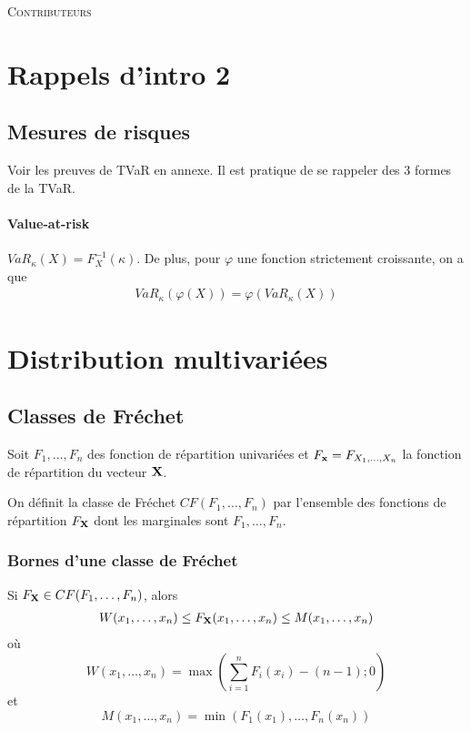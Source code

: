 \documentclass[10pt, french]{article}
\begin{document}
\begin{center}
	\textsc{\Large Contributeurs}\\[0.5cm] 
\end{center}


\newpage

\begin{multicols*}{2} 

\section{Rappels d'intro 2}
\subsection{Mesures de risques}
Voir les preuves de TVaR en annexe. Il est pratique de se rappeler des 3 formes de la TVaR.

\paragraph{Value-at-risk}
$VaR_{\kappa}(X) = F_{X}^{-1}(\kappa)$. De plus, pour $\varphi$ une fonction strictement croissante, on a que
\begin{align*}
VaR_{\kappa}(\varphi(X)) = \varphi \left ( VaR_{\kappa}(X) \right )
\end{align*}



\section{Distribution multivariées}
\subsection{Classes de Fréchet}
Soit $F_1, \dots, F_n$ des fonction de répartition univariées et $F_{\mathbf{x}} = F_{X_1, \dots, X_n}$ la fonction de répartition du vecteur $\mathbf{X}$.

On définit la classe de Fréchet $CF(F_1, \dots, F_n)$ par l'ensemble des fonctions de répartition $F_{\mathbf{X}}$ dont les marginales sont $F_1, \dots, F_n$.

\subsubsection{Bornes d'une classe de Fréchet}
Si $F_{\mathbf{X}} \in CF(F_1, \dots, F_n)$, alors
\begin{align*}
W(x_1, \dots, x_n) \leq F_{\mathbf{X}}(x_1, \dots, x_n) \leq M(x_1, \dots, x_n)
\end{align*}
où
\begin{equation}
\label{eq:cf-born-inf}
W(x_1, \dots, x_n) = \max \left (\sum_{i=1}^{n} F_i(x_i) - (n-1) ; 0 \right )
\end{equation}
et
\begin{equation}
\label{eq:cf-born-sup}
M(x_1, \dots, x_n)	 = \min \left ( F_1(x_1), \dots, F_n(x_n) \right)
\end{equation}



\end{multicols*}
\end{document}
